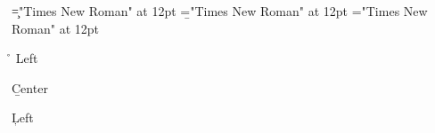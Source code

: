 \font\c="Times New Roman" at 12pt
\font\b="Times New Roman" at 12pt
\font\a="Times New Roman" at 12pt
 \r\n
\a Left

\centerline{\b Center
}
\c Left


\bye
